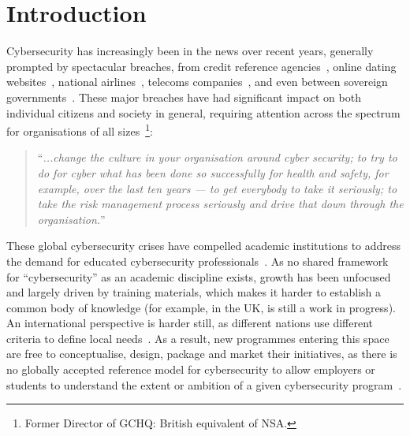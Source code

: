\documentclass[conference]{IEEEtran}
\begin{document}
\section{Introduction}

Cybersecurity has increasingly been in the news over recent years, generally prompted by spectacular breaches, from credit reference agencies~\cite{equifax2017}, online dating websites~\cite{ashleymadison2015}, national airlines~\cite{BritishAirways2018a}, telecoms companies~\cite{talktalk2016}, and even between sovereign governments~\cite{ncsc2018}. These major breaches have had significant impact on both individual citizens and society in general, requiring attention across the spectrum for organisations of all sizes~\cite{Hannigan2019a}\footnote{Former Director of GCHQ: British equivalent of NSA.}:
\begin{quote}
``{\emph{...change the culture in your organisation around cyber security; to try to do for cyber what has been done so successfully for health and safety, for example, over the last ten years --- to get everybody to take it seriously; to take the risk management process seriously and drive that down through the organisation.}}''
\end{quote}
\noindent
These global cybersecurity crises have compelled academic institutions to address the demand for educated cybersecurity professionals~\cite{McGettrick2013}. As no shared framework for ``cybersecurity'' as an academic discipline exists, growth has been unfocused and largely driven by training materials, which makes it harder to establish a common body of knowledge (for example, in the UK, \cite{Bristol2019a} is still a work in progress). An international perspective is harder still, as different nations use different criteria to define local needs~\cite{schneider2013}. As a result, new programmes entering this space are free to conceptualise, design, package and market their initiatives, as there is no globally accepted reference model for cybersecurity to allow employers or students to understand the extent or ambition of a given cybersecurity program~\cite{conklin-et-al:2014,Parrishetal2018a}.
\end{document}
